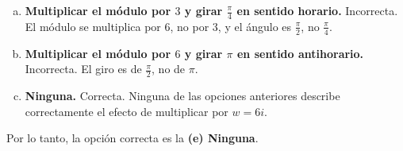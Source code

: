 \begin{prob}
\begin{myproof}
\begin{enumerate}[(a)]
\item \textbf{Multiplicar el módulo por $3$ y girar $\frac{\pi}{4}$ en sentido horario.}  
Incorrecta. El módulo se multiplica por $6$, no por $3$, y el ángulo es $\frac{\pi}{2}$, no $\frac{\pi}{4}$.

\item \textbf{Multiplicar el módulo por $6$ y girar $\pi$ en sentido antihorario.}  
Incorrecta. El giro es de $\frac{\pi}{2}$, no de $\pi$.

\item \textbf{Ninguna.}  
Correcta. Ninguna de las opciones anteriores describe correctamente el efecto de multiplicar por $w=6i$.
\end{enumerate}

Por lo tanto, la opción correcta es la \textbf{(e) Ninguna}.
\end{myproof}

\end{prob}



